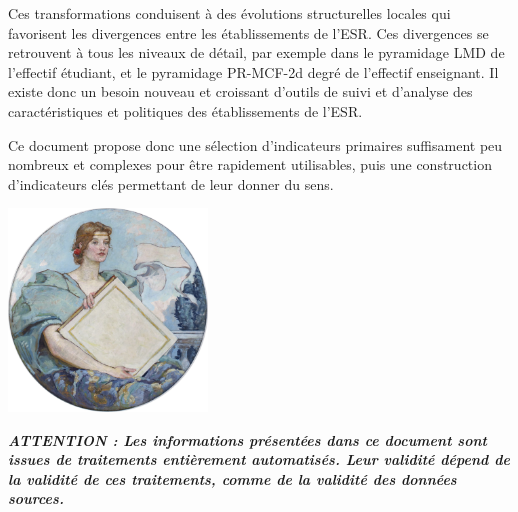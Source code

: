 \documentclass[12pt,french,landscape]{article}
\begin{document}
Ces transformations conduisent à des évolutions structurelles locales
qui favorisent les divergences entre les établissements de l'ESR. Ces
divergences se retrouvent à tous les niveaux de détail, par exemple dans
le pyramidage LMD de l'effectif étudiant, et le pyramidage PR-MCF-2d
degré de l'effectif enseignant. Il existe donc un besoin nouveau et
croissant d'outils de suivi et d'analyse des caractéristiques et
politiques des établissements de l'ESR.

Ce document propose donc une sélection d'indicateurs primaires
suffisament peu nombreux et complexes pour être rapidement utilisables,
puis une construction d'indicateurs clés permettant de leur donner du
sens.

\vspace*{\fill}

\begin{center}\includegraphics[width=200px,height=0.3\textheight]{files/589px-Knowledge-Reid-Highsmith} \end{center}

\textbf{\emph{ATTENTION : Les informations présentées dans ce document
sont issues de traitements entièrement automatisés. Leur validité dépend
de la validité de ces traitements, comme de la validité des données
sources.}}
\end{document}
